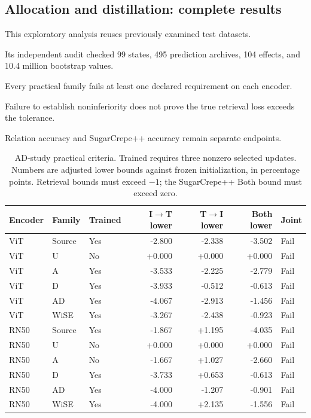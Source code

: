\subsection{Allocation and distillation: complete results}

This exploratory analysis reuses previously examined test datasets.

Its independent audit checked 99 states, 495 prediction archives, 104 effects, and 10.4 million bootstrap values.

Every practical family fails at least one declared requirement on each encoder.

Failure to establish noninferiority does not prove the true retrieval loss exceeds the tolerance.

Relation accuracy and SugarCrepe++ accuracy remain separate endpoints.

\begin{table}[t]
\centering
\small
\setlength{\tabcolsep}{3pt}
\begin{tabular}{lllrrrl}
\toprule
Encoder & Family & Trained & I$\to$T lower & T$\to$I lower & Both lower & Joint\\
\midrule
ViT & Source & Yes & -2.800 & -2.338 & -3.502 & Fail\\
ViT & U & No & +0.000 & +0.000 & +0.000 & Fail\\
ViT & A & Yes & -3.533 & -2.225 & -2.779 & Fail\\
ViT & D & Yes & -3.933 & -0.512 & -0.613 & Fail\\
ViT & AD & Yes & -4.067 & -2.913 & -1.456 & Fail\\
ViT & WiSE & Yes & -3.267 & -2.438 & -0.923 & Fail\\
RN50 & Source & Yes & -1.867 & +1.195 & -4.035 & Fail\\
RN50 & U & No & +0.000 & +0.000 & +0.000 & Fail\\
RN50 & A & No & -1.667 & +1.027 & -2.660 & Fail\\
RN50 & D & Yes & -3.733 & +0.653 & -0.613 & Fail\\
RN50 & AD & Yes & -4.000 & -1.207 & -0.901 & Fail\\
RN50 & WiSE & Yes & -4.000 & +2.135 & -1.556 & Fail\\
\bottomrule
\end{tabular}
\caption{AD-study practical criteria. Trained requires three nonzero selected updates. Numbers are adjusted lower bounds against frozen initialization, in percentage points. Retrieval bounds must exceed $-1$; the SugarCrepe++ Both bound must exceed zero.}\label{tab:newgates}
\end{table}



